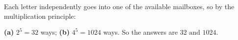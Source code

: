 Each letter independently goes into one of the available mailboxes, so by the multiplication principle:

\textbf{(a)} $2^5=32$ ways; \textbf{(b)} $4^5=1024$ ways. So the answers are $\boxed{32\text{ and }1024}$.
